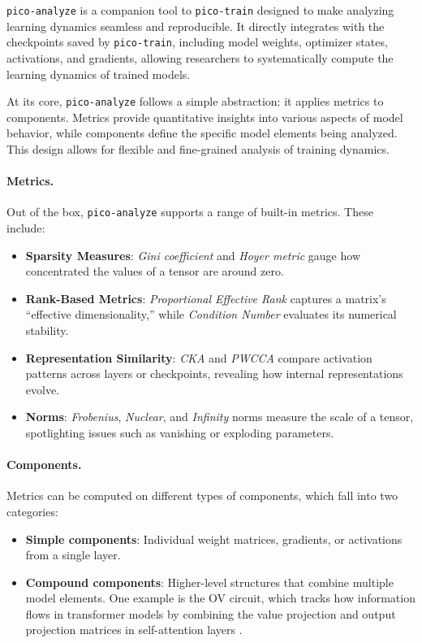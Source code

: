 \texttt{pico-analyze} is a companion tool to \texttt{pico-train} designed to make analyzing learning dynamics seamless and reproducible. It directly integrates with the checkpoints saved by \texttt{pico-train}, including model weights, optimizer states, activations, and gradients, allowing researchers to systematically compute the learning dynamics of trained models.

At its core, \texttt{pico-analyze} follows a simple abstraction: it applies metrics to components. Metrics provide quantitative insights into various aspects of model behavior, while components define the specific model elements being analyzed. This design allows for flexible and fine-grained analysis of training dynamics. 

\paragraph{Metrics.} Out of the box, \texttt{pico-analyze} supports a range of built-in metrics. These include:
\begin{itemize}
    \item \textbf{Sparsity Measures}: \textit{Gini coefficient} \citep{hurley2009gini} and \textit{Hoyer metric} \citep{hoyer2004sparsity} gauge how concentrated the values of a tensor are around zero.

    \item \textbf{Rank-Based Metrics}: \textit{Proportional Effective Rank} \citep{diehlmartinez2024tending} captures a matrix's “effective dimensionality,” while \textit{Condition Number} evaluates its numerical stability.

    \item \textbf{Representation Similarity}: \textit{CKA} \citep{kornblith2019cka} and \textit{PWCCA} \citep{morcos2018pwcca} compare activation patterns across layers or checkpoints, revealing how internal representations evolve.
    
    \item \textbf{Norms}: \textit{Frobenius}, \textit{Nuclear}, and \textit{Infinity} norms measure the scale of a tensor, spotlighting issues such as vanishing or exploding parameters.
\end{itemize}

\paragraph{Components.} Metrics can be computed on different types of components, which fall into two categories: 
\begin{itemize} 
\item \textbf{Simple components}: Individual weight matrices, gradients, or activations from a single layer. 
\item \textbf{Compound components}: Higher-level structures that combine multiple model elements. One example is the OV circuit, which tracks how information flows in transformer models by combining the value projection and output projection matrices in self-attention layers \cite{elhage2021mathematical}. 
\end{itemize}


